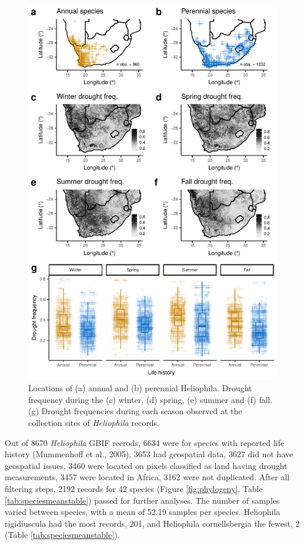 \documentclass[man,floatsintext]{apa6}
\theoremstyle{definition}
\theoremstyle{definition}
\theoremstyle{definition}
\theoremstyle{remark}
\begin{document}
\begin{figure}[!h]
\includegraphics[width=\textwidth]{../figures/maps_boxplots} \caption{Locations of (a) annual and (b) perennial Heliophila.
Drought frequency during the (c) winter, (d) spring, (e) summer and (f)
fall. (g) Drought frequencies during each season observed at the
collection sites of \emph{Heliophila} records.}\label{fig:mapsboxplots}
\end{figure}

Out of 8670 \emph{Heliophila} GBIF recrods, 6634 were for species with
reported life history (Mummenhoff et al., 2005), 3653 had geospatial
data, 3627 did not have geospatial issues, 3460 were located on pixels
classified as land having drought measurements, 3457 were located in
Africa, 3162 were not duplicated. After all filtering steps, 2192
records for 42 species (Figure \ref{fig:phylogeny}, Table
\ref{tab:speciesmeanstable}) passed for further analyses. The number of
samples varied between species, with a mean of 52.19 samples per
species. Heliophila rigidiuscula had the most records, 201, and
Heliophila cornellsbergia the fewest, 2 (Table
\ref{tab:speciesmeanstable}).
\end{document}

